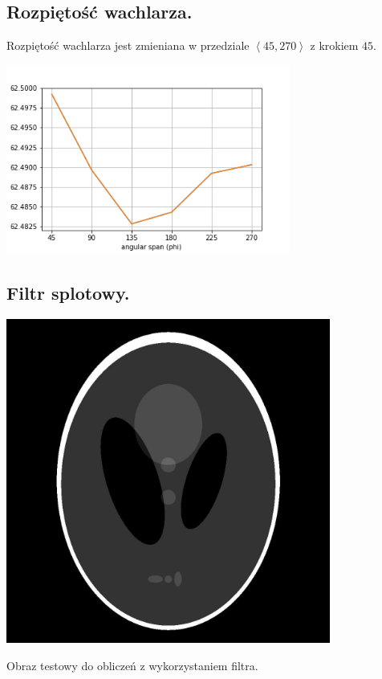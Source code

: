 \documentclass[a4paper, 11pt]{article}
\begin{document}
	\subsection{Rozpiętość wachlarza.}
	
	Rozpiętość wachlarza jest zmieniana w przedziale $\left<45, 270 \right>$ z krokiem $45$.
	
	\begin{center}
		\includegraphics[width=0.7\textwidth]{phi.png}
	\end{center}
	\subsection{Filtr splotowy.}
	\begin{center}
		\includegraphics[width=0.8\textwidth]{phantom.png}
		
		
		Obraz testowy do obliczeń z wykorzystaniem filtra.
	\end{center}
\end{document}
